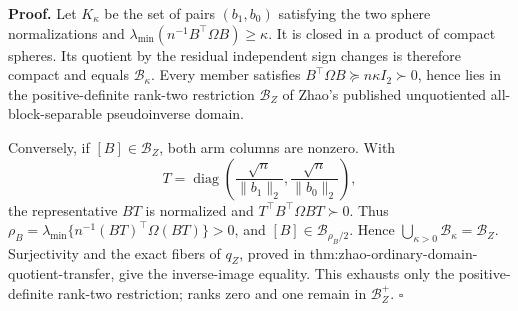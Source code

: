 \textbf{Proof.}
Let \(K_\kappa\) be the set of pairs \((b_1,b_0)\) satisfying the two sphere normalizations and \(\lambda_{\min}(n^{-1}B^\top\Omega B)\ge\kappa\).  It is closed in a product of compact spheres.  Its quotient by the residual independent sign changes is therefore compact and equals \(\mathcal B_\kappa\).  Every member satisfies \(B^\top\Omega B\succeq n\kappa I_2\succ0\), hence lies in the positive-definite rank-two restriction \(\mathcal B_Z\) of Zhao's published unquotiented all-block-separable pseudoinverse domain.

Conversely, if \([B]\in\mathcal B_Z\), both arm columns are nonzero.  With
\[
T=\operatorname{diag}\left(\frac{\sqrt n}{\lVert b_1\rVert_2},
\frac{\sqrt n}{\lVert b_0\rVert_2}\right),
\]
the representative \(BT\) is normalized and \(T^\top B^\top\Omega BT\succ0\).  Thus \(\rho_B=\lambda_{\min}\{n^{-1}(BT)^\top\Omega(BT)\}>0\), and \([B]\in\mathcal B_{\rho_B/2}\).  Hence \(\bigcup_{\kappa>0}\mathcal B_\kappa=\mathcal B_Z\).  Surjectivity and the exact fibers of \(q_Z\), proved in thm:zhao-ordinary-domain-quotient-transfer, give the inverse-image equality.  This exhausts only the positive-definite rank-two restriction; ranks zero and one remain in \(\mathcal B_Z^+\). \(\square\)